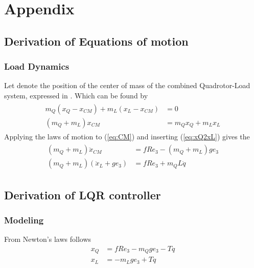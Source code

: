 \chapter{Appendix}

\section{Derivation of Equations of motion}
\subsection{Load Dynamics}\label{sec.app:loaddyn}

Let  denote the position of the center of mass of the combined Quadrotor-Load system, expressed in \IF. Which can be found by
\begin{align}\label{eq:CM}
\begin{split}
m_Q(x_Q-x_{CM})+m_L(x_L-x_{CM})&=0\\
(m_Q+m_L)x_{CM}&=m_Qx_Q+m_Lx_L
\end{split}
\end{align}
Applying the laws of motion to (\ref{eq:CM}) and inserting (\ref{eq:xQ2xL}) gives the 
\begin{align}\label{key}
\begin{split}
(m_Q+m_L)\ddot{x}_{CM}&=fRe_3 - (m_Q+m_L)ge_3\\
(m_Q+m_L)(\ddot{x}_L+ge_3)&= fRe_3+m_QL\ddot{q}
\end{split}
\end{align}



\section{Derivation of LQR controller}\label{app:lqr}

\subsection{Modeling}
From Newton's laws follows
\begin{align}
x_Q&=fRe_3-m_Qge_3-Tq\\
x_L&=-m_Lge_3+Tq
\end{align}

